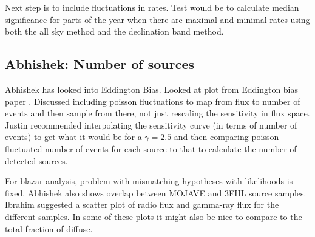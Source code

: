 Next step is to include fluctuations in rates. Test would be to calculate median significance for parts of the year when there are maximal and minimal rates using both the all sky method and the declination band method. 

\subsection*{\textbf{Abhishek: Number of sources}}
Abhishek has looked into Eddington Bias. Looked at plot from Eddington bias paper \cite{Strotjohann:2018ufz}. Discussed including poisson fluctuations to map from flux to number of events and then sample from there, not just rescaling the sensitivity in flux space. Justin recommended interpolating the sensitivity curve (in terms of number of events) to get what it would be for a $\gamma = 2.5$ and then comparing poisson fluctuated number of events for each source to that to calculate the number of detected sources. 

For blazar analysis, problem with mismatching hypotheses with likelihoods is fixed. Abhishek also shows overlap between MOJAVE and 3FHL source samples. Ibrahim suggested a scatter plot of radio flux and gamma-ray flux for the different samples. In some of these plots it might also be nice to compare to the total fraction of diffuse.
